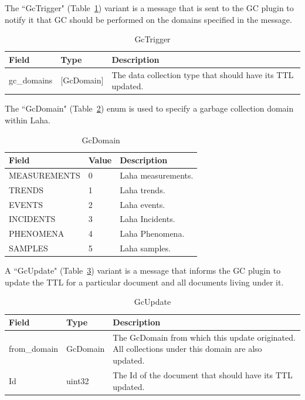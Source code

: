 The ``GcTrigger" (Table~\ref{table:GcTrigger}) variant is a message that is sent to the GC plugin to notify it that GC should be performed on the domains specified in the message.

\begin{table}[H]
	\centering
	\caption{GcTrigger}
	\begin{tabularx}{\textwidth}{llX}
		\toprule
		\textbf{Field} & \textbf{Type} & \textbf{Description} \\
		\midrule
		gc\_domains & [GcDomain] & The data collection type that should have its TTL updated.  \\
		\bottomrule
	\end{tabularx}
	\label{table:GcTrigger}
\end{table}

The ``GcDomain" (Table~\ref{table:GcDomain}) enum is used to specify a garbage collection domain within Laha.

\begin{table}[H]
	\centering
	\caption{GcDomain}
	\begin{tabularx}{\textwidth}{lll}
		\toprule
		\textbf{Field} & \textbf{Value} & \textbf{Description} \\
		\midrule
		MEASUREMENTS & 0 & Laha measurements.  \\
		TRENDS & 1 & Laha trends. \\
		EVENTS & 2 & Laha events. \\
		INCIDENTS & 3 & Laha Incidents. \\
		PHENOMENA & 4 & Laha Phenomena. \\
		SAMPLES & 5 & Laha samples. \\
		\bottomrule
	\end{tabularx}
	\label{table:GcDomain}
\end{table}

A ``GcUpdate" (Table~\ref{table:GcUpdate}) variant is a message that informs the GC plugin to update the TTL for a particular document and all documents living under it.

\begin{table}[H]
	\centering
	\caption{GcUpdate}
	\begin{tabularx}{\textwidth}{llX}
		\toprule
		\textbf{Field} & \textbf{Type} & \textbf{Description} \\
		\midrule
		from\_domain & GcDomain & The GcDomain from which this update originated. All collections under this domain are also updated.  \\
		Id & uint32 & The Id of the document that should have its TTL updated. \\
		\bottomrule
	\end{tabularx}
	\label{table:GcUpdate}
\end{table}


